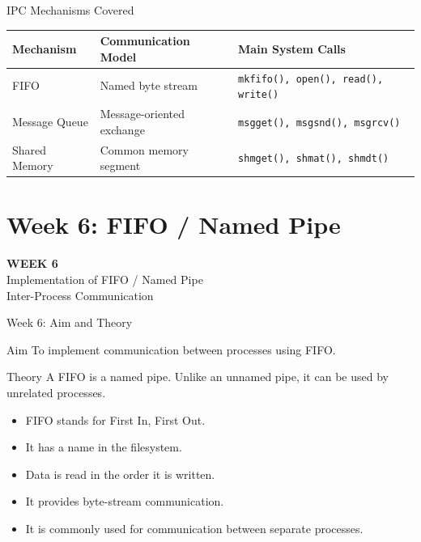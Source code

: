 \documentclass[aspectratio=169,10pt]{beamer}
\begin{document}
\begin{frame}{IPC Mechanisms Covered}

\begin{center}
\begin{tabular}{p{3cm}p{3.8cm}p{4.5cm}}
\toprule
\textbf{Mechanism} &
\textbf{Communication Model} &
\textbf{Main System Calls}\\
\midrule
FIFO &
Named byte stream &
\texttt{mkfifo(), open(), read(), write()}\\
\addlinespace
Message Queue &
Message-oriented exchange &
\texttt{msgget(), msgsnd(), msgrcv()}\\
\addlinespace
Shared Memory &
Common memory segment &
\texttt{shmget(), shmat(), shmdt()}\\
\bottomrule
\end{tabular}
\end{center}

\end{frame}

\section{Week 6: FIFO / Named Pipe}

\begin{frame}
\centering
\vfill
{\Huge\bfseries WEEK 6}\\[0.5cm]
{\LARGE Implementation of FIFO / Named Pipe}\\[0.4cm]
{\large Inter-Process Communication}
\vfill
\end{frame}

\begin{frame}{Week 6: Aim and Theory}

\begin{block}{Aim}
To implement communication between processes
using FIFO.
\end{block}

\begin{block}{Theory}
A FIFO is a named pipe. Unlike an unnamed pipe,
it can be used by unrelated processes.
\end{block}

\begin{itemize}
    \item FIFO stands for First In, First Out.
    \item It has a name in the filesystem.
    \item Data is read in the order it is written.
    \item It provides byte-stream communication.
    \item It is commonly used for communication
    between separate processes.
\end{itemize}

\end{frame}
\end{document}
